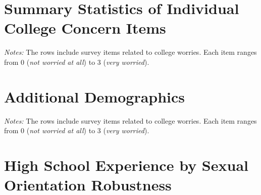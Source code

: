 \begin{table}
\centering
\caption{High School Experience Items by Sexual Orientation}
\label{tab:hsexp_items_by_so}
\footnotesize
\setlength{\tabcolsep}{3pt}

\end{table}

\section{Summary Statistics of Individual College Concern Items}\label{appendix-d-summary-statistics-of-individual-college-concern-items}
\begin{table}
\centering
\caption{College Concern Items by Gender Identity}
\label{tab:concerns_by_gender}
\footnotesize
\setlength{\tabcolsep}{1pt}

\end{table}

\begin{table}
\centering
\caption{College Concern Items by Sexual Orientation}
\label{tab:concerns_by_so}
\footnotesize
\setlength{\tabcolsep}{1pt}

\medskip
\begin{minipage}{\linewidth}
\noindent\footnotesize\textit{Notes:} The rows include survey items related to college worries. Each
item ranges from 0 (\emph{not worried at all}) to 3 (\emph{very worried}).
\end{minipage}
\end{table}

\section{Additional Demographics}\label{appendix-e-additional-demographics}
\begin{table}[!ht]
\centering
\caption{Demographic Characteristics of Qualitative Response Participants}
\label{tab:qual_demographics}

\medskip
\begin{minipage}{\linewidth}
\noindent\footnotesize\textit{Notes:} The rows include survey items related to college worries. Each
item ranges from 0 (\emph{not worried at all}) to 3 (\emph{very worried}).
\end{minipage}
\end{table}
\section{High School Experience by Sexual Orientation Robustness}\label{appendix-f-high-school-experience-by-sexual-orientation-robustness}


